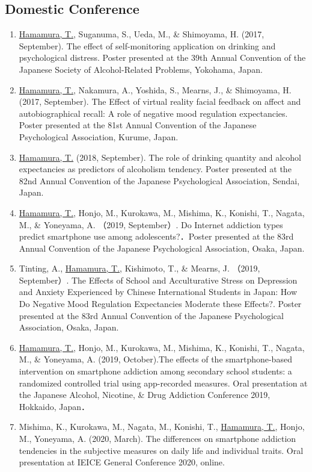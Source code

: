 \documentclass{article}
\begin{document}
\subsection{Domestic Conference}
\begin{enumerate}
	\item \underline{Hamamura, T.}, Suganuma, S., Ueda, M., \& Shimoyama, H. (2017, September). The effect of self-monitoring application on drinking and psychological distress. Poster presented at the 39th Annual Convention of the Japanese Society of Alcohol-Related Problems, Yokohama, Japan.
	\item \underline{Hamamura, T.}, Nakamura, A., Yoshida, S., Mearns, J., \& Shimoyama, H. (2017, September). The Effect of virtual reality facial feedback on affect and autobiographical recall: A role of negative mood regulation expectancies. Poster presented at the 81st Annual Convention of the Japanese Psychological Association, Kurume, Japan.
	\item \underline{Hamamura, T.} (2018, September). The role of drinking quantity and alcohol expectancies as predictors of alcoholism tendency. Poster presented at the 82nd Annual Convention of the Japanese Psychological Association, Sendai, Japan.
	\item \underline{Hamamura, T.}, Honjo, M., Kurokawa, M., Mishima, K., Konishi, T., Nagata, M., \& Yoneyama, A. （2019, September）. Do Internet addiction types predict smartphone use among adolescents?．Poster presented at the 83rd Annual Convention of the Japanese Psychological Association, Osaka, Japan.
	\item Tinting, A., \underline{Hamamura, T.}, Kishimoto, T., \& Mearns, J. （2019, September）. The Effects of School and Acculturative Stress on Depression and Anxiety Experienced by Chinese International Students in Japan: How Do Negative Mood Regulation Expectancies Moderate these Effects?. Poster presented at the 83rd Annual Convention of the Japanese Psychological Association, Osaka, Japan.
	\item \underline{Hamamura, T.}, Honjo, M., Kurokawa, M., Mishima, K., Konishi, T., Nagata, M., \& Yoneyama, A. (2019, October).The effects of the smartphone-based intervention on smartphone addiction among secondary school students: a randomized controlled trial using app-recorded measures. Oral presentation at the Japanese Alcohol, Nicotine, \& Drug Addiction Conference 2019, Hokkaido, Japan．
	\item Mishima, K., Kurokawa, M., Nagata, M., Konishi, T., \underline{Hamamura, T.}, Honjo, M., Yoneyama, A. (2020, March). The differences on smartphone addiction tendencies in the subjective measures on daily life and individual traits. Oral presentation at IEICE General Conference 2020, online.

\end{enumerate}
\end{document}

